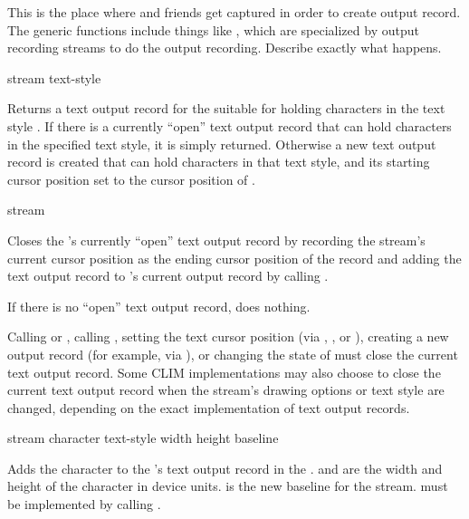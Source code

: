  {This is the place where  and friends get captured
in order to create output record.  The generic functions include things like
, which are specialized by output recording streams to
do the output recording.  Describe exactly what happens.}

 {stream text-style}

Returns a text output record for the  
suitable for holding characters in the text style .  If there is
a currently ``open'' text output record that can hold characters in the
specified text style, it is simply returned.  Otherwise a new text output record
is created that can hold characters in that text style, and its starting cursor
position set to the cursor position of .

 {stream}

Closes the  's currently ``open'' text
output record by recording the stream's current cursor position as the ending
cursor position of the record and adding the text output record to
's current output record by calling .

If there is no ``open'' text output record, 
does nothing.

Calling  or , calling
, setting the text cursor position (via
, , or ), creating a
new output record (for example, via ), or changing
the state of  must close the current text output record.
Some CLIM implementations may also choose to close the current text output
record when the stream's drawing options or text style are changed, depending on
the exact implementation of text output records.


 {stream character text-style
                                           width height baseline}

Adds the character  to the 
's text output record in the  .
 and  are the width and height of the character in device
units.   is the new baseline for the stream.
 must be implemented by calling
.

